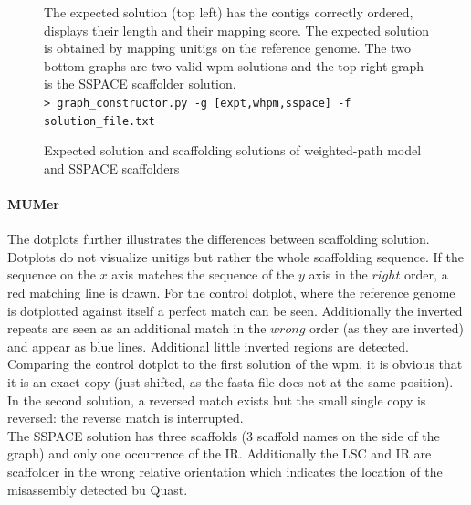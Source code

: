 \documentclass[12pt]{article}
\begin{document}
\begin{figure}[h!]
\begin{center}
{\begin{tikzpicture}
\end{tikzpicture}
}
\end{center}
\caption{Expected solution and scaffolding solutions of weighted-path model and SSPACE scaffolders}
\footnotesize The expected solution (top left) has the contigs correctly ordered, displays their length and their mapping score. The expected solution is obtained by mapping unitigs on the reference genome. The two bottom graphs are two valid wpm solutions and the top right graph is the SSPACE scaffolder solution. \\ \texttt{> graph\_constructor.py -g [expt,whpm,sspace] -f solution\_file.txt}

\label{fig:scafsols}
\end{figure}

\paragraph*{MUMer}
The dotplots further illustrates the differences between scaffolding solution. Dotplots do not visualize unitigs but rather the whole scaffolding sequence. If the sequence on the $x$ axis matches the sequence of the $y$ axis in the $right$ order, a red matching line is drawn. For the control dotplot, where the reference genome is dotplotted against itself a perfect match can be seen. Additionally the inverted repeats are seen as an additional match in the $wrong$ order (as they are inverted) and appear as blue lines. Additional little inverted regions are detected. Comparing the control dotplot to the first solution of the wpm, it is obvious that it is an exact copy (just shifted, as the fasta file does not at the same position). In the second solution, a reversed match exists but the small single copy is reversed: the reverse match is interrupted. \\ The SSPACE solution has three scaffolds (3 scaffold names on the side of the graph) and only one occurrence of the IR. Additionally the LSC and IR are scaffolder in the wrong relative orientation which indicates the location of the misassembly detected bu Quast.
\end{document}
